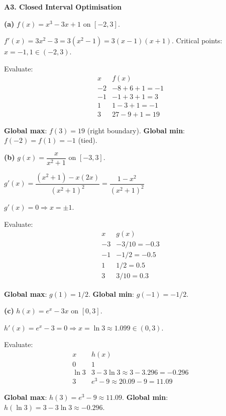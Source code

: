 \documentclass[12pt, a4paper]{article}
\theoremstyle{definition}
\begin{document}
\begin{solbox}
\textbf{A3. Closed Interval Optimisation}

\textbf{(a)} $f(x)=x^3-3x+1$ on $[-2,3]$.

$f'(x)=3x^2-3=3(x^2-1)=3(x-1)(x+1)$. Critical points: $x=-1,1\in(-2,3)$.

Evaluate:
\[
\begin{array}{c|c}
  x & f(x) \\\hline
  -2 & -8+6+1=-1 \\
  -1 & -1+3+1=3 \\
  1  & 1-3+1=-1 \\
  3  & 27-9+1=19
\end{array}
\]

\textbf{Global max}: $f(3)=19$ (right boundary). \quad
\textbf{Global min}: $f(-2)=f(1)=-1$ (tied).

\medskip
\textbf{(b)} $g(x)=\dfrac{x}{x^2+1}$ on $[-3,3]$.

$g'(x)=\dfrac{(x^2+1)-x(2x)}{(x^2+1)^2}=\dfrac{1-x^2}{(x^2+1)^2}$

$g'(x)=0\Rightarrow x=\pm 1$.

Evaluate:
\[
\begin{array}{c|c}
  x & g(x) \\\hline
  -3 & -3/10=-0.3 \\
  -1 & -1/2=-0.5 \\
  1  & 1/2=0.5 \\
  3  & 3/10=0.3
\end{array}
\]

\textbf{Global max}: $g(1)=1/2$. \quad
\textbf{Global min}: $g(-1)=-1/2$.

\medskip
\textbf{(c)} $h(x)=e^x-3x$ on $[0,3]$.

$h'(x)=e^x-3=0\Rightarrow x=\ln 3\approx 1.099\in(0,3)$.

Evaluate:
\[
\begin{array}{c|c}
  x & h(x) \\\hline
  0 & 1 \\
  \ln 3 & 3-3\ln 3\approx 3-3.296= -0.296 \\
  3 & e^3-9\approx 20.09-9=11.09
\end{array}
\]

\textbf{Global max}: $h(3)=e^3-9\approx 11.09$. \quad
\textbf{Global min}: $h(\ln 3)=3-3\ln 3\approx-0.296$.
\end{solbox}
\end{document}
